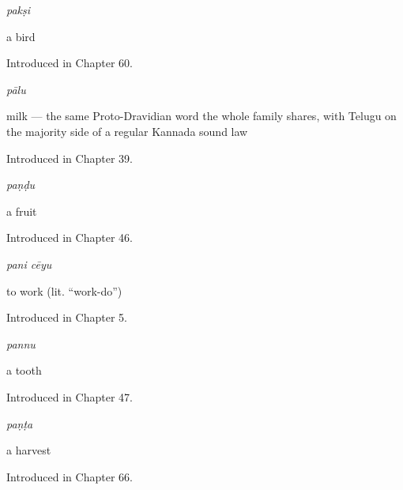 \noindent\begin{minipage}[t]{\linewidth}
\raggedright
\textbf{}\enspace\emph{pakṣi}\par
\small a bird\par
\footnotesize Introduced in Chapter 60.
\end{minipage}\par\medskip

\noindent\begin{minipage}[t]{\linewidth}
\raggedright
\textbf{}\enspace\emph{pālu}\par
\small milk — the same Proto-Dravidian word the whole family shares, with Telugu on the majority side of a regular Kannada sound law\par
\footnotesize Introduced in Chapter 39.
\end{minipage}\par\medskip

\noindent\begin{minipage}[t]{\linewidth}
\raggedright
\textbf{}\enspace\emph{paṇḍu}\par
\small a fruit\par
\footnotesize Introduced in Chapter 46.
\end{minipage}\par\medskip

\noindent\begin{minipage}[t]{\linewidth}
\raggedright
\textbf{ }\enspace\emph{pani cēyu}\par
\small to work (lit. \textquotedblleft{}work-do\textquotedblright{})\par
\footnotesize Introduced in Chapter 5.
\end{minipage}\par\medskip

\noindent\begin{minipage}[t]{\linewidth}
\raggedright
\textbf{}\enspace\emph{pannu}\par
\small a tooth\par
\footnotesize Introduced in Chapter 47.
\end{minipage}\par\medskip

\noindent\begin{minipage}[t]{\linewidth}
\raggedright
\textbf{}\enspace\emph{paṇṭa}\par
\small a harvest\par
\footnotesize Introduced in Chapter 66.
\end{minipage}\par\medskip

